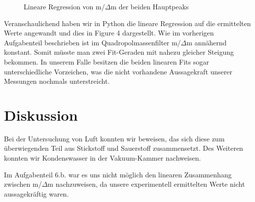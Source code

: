 \documentclass[10pt,a4paper]{article}
\begin{document}
\begin{figure}[h]
	\caption{Lineare Regression von m/$\Delta$m der beiden Hauptpeaks}
\end{figure}
Veranschaulichend haben wir in Python die lineare Regression auf die ermittelten Werte angewandt und dies in Figure 4 dargestellt. Wie im vorherigen Aufgabenteil beschrieben ist im Quadropolmassenfilter m/$\Delta$m annähernd konstant. Somit müsste man zwei Fit-Geraden mit nahezu gleicher Steigung bekommen. In unserem Falle besitzen die beiden linearen Fits sogar unterschiedliche Vorzeichen, was die nicht vorhandene Aussagekraft unserer Messungen nochmals unterstreicht. 
\section{Diskussion}
Bei der Untersuchung von Luft konnten wir beweisen, das sich diese zum überwiegenden Teil aus Stickstoff und Sauerstoff zusammensetzt.
Des Weiteren konnten wir Kondenswasser in der Vakuum-Kammer nachweisen.

Im Aufgabenteil 6.b. war es uns nicht möglich den linearen Zusammenhang zwischen m/$\Delta$m nachzuweisen, da unsere experimentell ermittelten Werte nicht aussagekräftig waren. 
\end{document}
